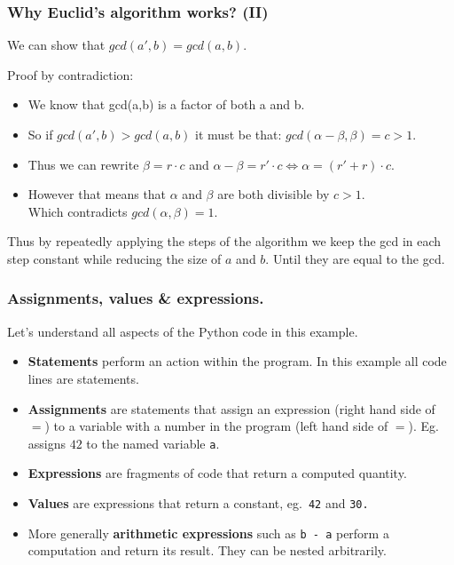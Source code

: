 \documentclass{beamer} %
\newcommand\emc[1]{\textcolor{midred}{\textbf{#1}}}
\begin{document}
\begin{frame}
\frametitle{Why Euclid's algorithm works? (II)}

We can show that $gcd(a', b) = gcd(a,b)$.

Proof by contradiction: 

\begin{itemize}
\item We know that gcd(a,b) is a factor of both a and b. 
\item So if $gcd(a', b) > gcd(a,b)$ it must be that:
$gcd(\alpha - \beta, \beta) = c > 1$. 
\item Thus we can rewrite $\beta = r \cdot c$ and $\alpha - \beta = r' \cdot c \Leftrightarrow \alpha = (r' + r) \cdot c $. 
\item However that means that $\alpha$ and $\beta$ are both divisible by $c > 1$. \\ Which contradicts $gcd(\alpha, \beta) = 1$.
\end{itemize}

Thus by repeatedly applying the steps of the algorithm we keep the gcd in each step constant while reducing the size of $a$ and $b$. Until they are equal to the gcd.

\end{frame}




\begin{frame}
\frametitle{Assignments, values \& expressions.}

Let's understand all aspects of the Python code in this example.
\begin{itemize}
\item \emc{Statements} perform an action within the program. In this example all code lines are statements.
\item \emc{Assignments} are statements that assign an expression (right hand side of $=$) to a variable with a number in the program (left hand side of $=$). Eg.\  assigns $42$ to the named variable \texttt{a}.
\item \emc{Expressions} are fragments of code that return a computed quantity.
\item \emc{Values} are expressions that return a constant, eg.\ \texttt{42} and \texttt{30.}
\item More generally \emc{arithmetic expressions} such as \texttt{b - a} perform a computation and return its result. They can be nested arbitrarily.
\end{itemize}

\end{frame}
\end{document}
